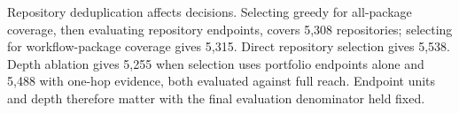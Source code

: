 Repository deduplication affects decisions. Selecting greedy for all-package coverage, then evaluating repository endpoints, covers 5,308 repositories; selecting for workflow-package coverage gives 5,315. Direct repository selection gives 5,538. Depth ablation gives 5,255 when selection uses portfolio endpoints alone and 5,488 with one-hop evidence, both evaluated against full reach. Endpoint units and depth therefore matter with the final evaluation denominator held fixed.
